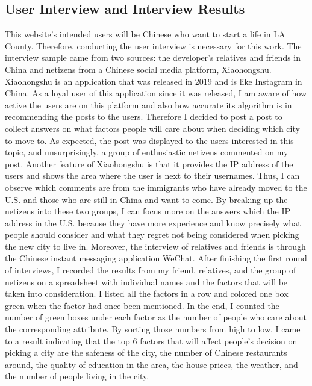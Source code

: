\documentclass[10pt,twocolumn]{article}
\begin{document}
\subsection{User Interview and Interview Results}
This website's intended users will be Chinese who want to start a life in LA County. Therefore, conducting the user interview is necessary for this work. The interview sample came from two sources: the developer's relatives and friends in China and netizens from a Chinese social media platform, Xiaohongshu. 
\newline
\indent
Xiaohongshu is an application that was released in 2019 and is like Instagram in China. As a loyal user of this application since it was released, I am aware of how active the users are on this platform and also how accurate its algorithm is in recommending the posts to the users. Therefore I decided to post a post to collect answers on what factors people will care about when deciding which city to move to. As expected, the post was displayed to the users interested in this topic, and unsurprisingly, a group of enthusiastic netizens commented on my post. Another feature of Xiaohongshu is that it provides the IP address of the users and shows the area where the user is next to their usernames. Thus, I can observe which comments are from the immigrants who have already moved to the U.S. and those who are still in China and want to come. By breaking up the netizens into these two groups, I can focus more on the answers which the IP address in the U.S. because they have more experience and know precisely what people should consider and what they regret not being considered when picking the new city to live in. Moreover, the interview of relatives and friends is through the Chinese instant messaging application WeChat. 
\newline
\indent
After finishing the first round of interviews, I recorded the results from my friend, relatives, and the group of netizens on a spreadsheet with individual names and the factors that will be taken into consideration. I listed all the factors in a row and colored one box green when the factor had once been mentioned. In the end, I counted the number of green boxes under each factor as the number of people who care about the corresponding attribute. By sorting those numbers from high to low, I came to a result indicating that the top 6 factors that will affect people's decision on picking a city are the safeness of the city, the number of Chinese restaurants around,  the quality of education in the area, the house prices, the weather, and the number of people living in the city.
\end{document}
